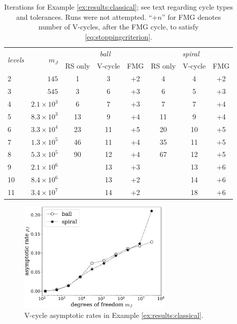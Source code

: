 \documentclass[review,hidelinks,onefignum,onetabnum,final]{siamart220329}  %
\newcommand{\XX}{\ding{55}}
\begin{document}
\begin{table}[ht]
\centering
\begin{tabular}{lr@{\hskip 7mm}cccccc}
\toprule
\multirow{2}{*}{\emph{levels}} & \multirow{2}{*}{$m_J$} & \multicolumn{3}{c}{\,\emph{ball}} & \multicolumn{3}{c}{\,\emph{spiral}} \\ \cmidrule(lr){3-5} \cmidrule(lr){6-8}
   &                  & RS only & V-cycle & FMG & RS only & V-cycle & FMG \\
\midrule
 2 &            $145$ &   1 &  3 &  +2 &   4 &  4 &  +2 \\
 3 &            $545$ &   3 &  6 &  +3 &   6 &  5 &  +3 \\
 4 & $2.1\times 10^3$ &   6 &  7 &  +3 &   7 &  7 &  +4 \\
 5 & $8.3\times 10^3$ &  13 &  9 &  +4 &  11 &  9 &  +4 \\
 6 & $3.3\times 10^4$ &  23 & 11 &  +5 &  20 & 10 &  +5 \\
 7 & $1.3\times 10^5$ &  46 & 11 &  +4 &  35 & 11 &  +5 \\
 8 & $5.3\times 10^5$ &  90 & 12 &  +4 &  67 & 12 &  +5 \\
 9 & $2.1\times 10^6$ & \XX & 13 &  +3 & \XX & 13 &  +6 \\
10 & $8.4\times 10^6$ & \XX & 13 &  +2 & \XX & 14 &  +6 \\
11 & $3.4\times 10^7$ & \XX & 14 &  +2 & \XX & 18 &  +6 \\
\bottomrule
\end{tabular}
\bigskip
\caption{Iterations for Example \ref{ex:results:classical}; see text regarding cycle types and tolerances.  Runs \XX\xspace were not attempted. ``$+n$'' for FMG denotes number of V-cycles, after the FMG cycle, to satisfy \eqref{eq:stoppingcriterion}.}
\label{tab:results:classical}
\end{table}

\begin{figure}[ht]
\centering
\includegraphics[width=0.65\textwidth]{asymprates.pdf}
\caption{V-cycle asymptotic rates in Example \ref{ex:results:classical}.}
\label{fig:results:asymp}
\end{figure}
\end{document}
